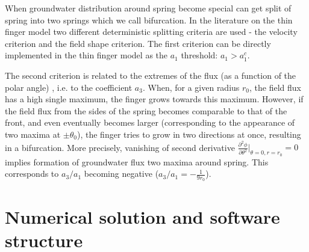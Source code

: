 \documentclass[]{pracamgr}
\begin{document}
    When groundwater distribution around spring become special can get split of spring into two springs which we call bifurcation. In the literature on the thin finger model two different deterministic splitting criteria are used - the velocity criterion and the field shape criterion. The first criterion can be directly implemented in the thin finger model as the $a_1$ threshold: $a_1 > a_1^c$.

    The second criterion is related to the extremes of the flux (as a function of the polar angle) \cite{petroff2013bifurcation, kaandorp2001algorithmic_Chapter4.4}, i.e. to the coefficient $a_3$. When, for a given radius $r_0$, the field flux has a high single maximum, the finger grows towards this maximum. However, if the field flux from the sides of the spring becomes comparable to that of the front, and even eventually becomes larger (corresponding to the appearance of two maxima at $\pm \theta_0$), the finger tries to grow in two directions at once, resulting in a bifurcation. More precisely, vanishing of second derivative $\frac{\partial^2 \phi}{\partial \theta^2}\big|_{\theta=0, r=r_0} = 0$ implies formation of groundwater flux two maxima around spring. This corresponds to $a_3/a_1$ becoming negative ($a_3/a_1 = -\frac{1}{9 r_0}$).

  \chapter{Numerical solution and software structure}
\end{document}
